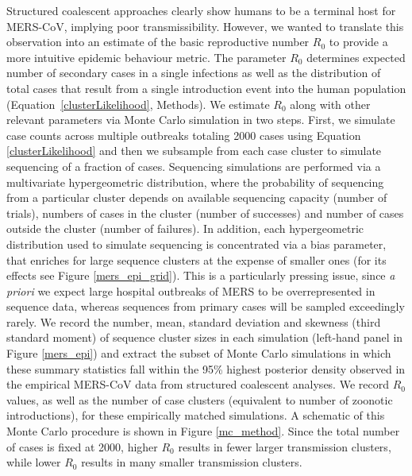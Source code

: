 \documentclass[9pt,lineno]{elife}
\begin{document}
Structured coalescent approaches clearly show humans to be a terminal host for MERS-CoV, implying poor transmissibility.
However, we wanted to translate this observation into an estimate of the basic reproductive number $R_{0}$ to provide a more intuitive epidemic behaviour metric.
The parameter $R_{0}$ determines expected number of secondary cases in a single infections as well as the distribution of total cases that result from a single introduction event into the human population (Equation~\ref{clusterLikelihood}, Methods).
We estimate $R_{0}$ along with other relevant parameters via Monte Carlo simulation in two steps.
First, we simulate case counts across multiple outbreaks totaling 2000 cases using Equation \ref{clusterLikelihood} and then we subsample from each case cluster to simulate sequencing of a fraction of cases.
Sequencing simulations are performed via a multivariate hypergeometric distribution, where the probability of sequencing from a particular cluster depends on available sequencing capacity (number of trials), numbers of cases in the cluster (number of successes) and number of cases outside the cluster (number of failures).
In addition, each hypergeometric distribution used to simulate sequencing is concentrated via a bias parameter, that enriches for large sequence clusters at the expense of smaller ones (for its effects see Figure \ref{mers_epi_grid}).
This is a particularly pressing issue, since \textit{a priori} we expect large hospital outbreaks of MERS to be overrepresented in sequence data, whereas sequences from primary cases will be sampled exceedingly rarely.
We record the number, mean, standard deviation and skewness (third standard moment) of sequence cluster sizes in each simulation (left-hand panel in Figure \ref{mers_epi}) and extract the subset of Monte Carlo simulations in which these summary statistics fall within the 95\% highest posterior density observed in the empirical MERS-CoV data from structured coalescent analyses.
We record $R_{0}$ values, as well as the number of case clusters (equivalent to number of zoonotic introductions), for these empirically matched simulations.
A schematic of this Monte Carlo procedure is shown in Figure \ref{mc_method}.
Since the total number of cases is fixed at 2000, higher $R_0$ results in fewer larger transmission clusters, while lower $R_0$ results in many smaller transmission clusters.
\end{document}
